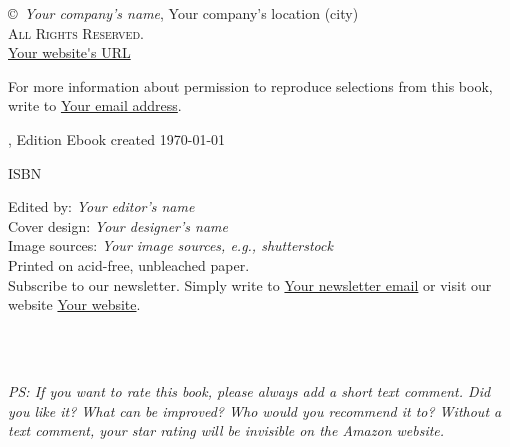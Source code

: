 

\thispagestyle{empty}
\begin{center}

\copyright~\the\year \textit{Your company's name}, Your company's location (city)\\
\textsc{All Rights Reserved.}\\
\url{Your website's URL}

For more information about permission to reproduce selections from this book, write to \url{Your email address}.

\ifxetex
	\the\year, Edition
\else
	Ebook created \today
\fi

\ifxetex
	\textsc{ISBN}
\fi


Edited by: \emph{Your editor's name}\\
Cover design: \emph{Your designer's name}\\
Image sources: \emph{Your image sources, e.g., shutterstock}\\


\ifxetex
	Printed on acid\hyp{}free, unbleached paper.
\fi
~\\	

Subscribe to our newsletter. Simply write to \url{Your newsletter email} or visit our website \url{Your website}.

\ifxetex
\else
	~\\
	~\\\par	
	\textit{PS: If you want to rate this book, please always add a short text comment. Did you like it? What can be improved? Who would you recommend it to? Without a text comment, your star rating will be invisible on the Amazon website.}
	\myrule
\fi
	
\end{center}



